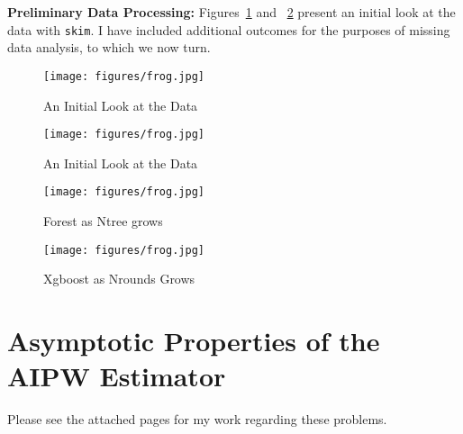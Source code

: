     \textbf{Preliminary Data Processing:}
    Figures~\ref{fig:hw-04_q-01a_data-skim_keepvars-01} and ~\ref{fig:hw-04_q-01a_data-skim_keepvars-02} present an initial look at the data with \verb+skim+. I have included additional outcomes for the purposes of missing data analysis, to which we now turn. 
    

    \begin{figure}[H]
	\centering %
	\texttt{[image: figures/frog.jpg]}
	\caption{An Initial Look at the Data} 
	\label{fig:hw-04_q-01a_data-skim_keepvars-01}
    \end{figure}
    
        \begin{figure}[H]
	\centering %
	\texttt{[image: figures/frog.jpg]}
	\caption{An Initial Look at the Data} 
	\label{fig:hw-04_q-01a_data-skim_keepvars-02}
    \end{figure}

   
            



   
    

    \begin{figure}
    \centering
    \begin{minipage}{0.45\textwidth}
        \centering
        \texttt{[image: figures/frog.jpg]} %
        \caption{Forest as Ntree grows}
       \label{fig:hw-04_q-01e_forest}
    \end{minipage}\hfill
    \begin{minipage}{0.45\textwidth}
        \centering
        \texttt{[image: figures/frog.jpg]} %
        \caption{Xgboost as Nrounds Grows}
    \end{minipage}
    \label{fig:hw-04_q-01e_xg}
\end{figure}






\section{Asymptotic Properties of the AIPW Estimator}

    Please see the attached pages for my work regarding these problems. 
    
     


